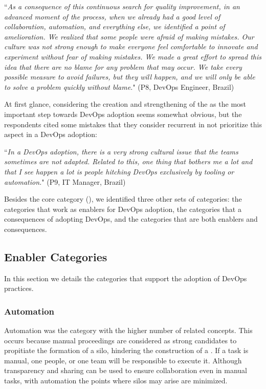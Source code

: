 \begin{mq}
``\emph{As a consequence of this continuous search for quality improvement, in an
advanced moment of the process, when we already had a good level of
collaboration, automation, and everything else, we identified a point of
amelioration. We realized that some people were afraid of making mistakes. Our
culture was not strong enough to make everyone feel comfortable to innovate and
experiment without fear of making mistakes. We made a great effort to spread
this idea that there are no blame for any problem that may occur. We take every possible
measure to avoid failures, but they
will happen, and we will only be able to solve a problem quickly without blame.}" (P8,
DevOps Engineer, Brazil)
\end{mq}

At first glance, considering the creation and strengthening of the  as the most important step towards DevOps adoption seems somewhat obvious, but
the respondents cited some mistakes that they consider recurrent in not
prioritize this aspect in a DevOps adoption:

\begin{mq}``\emph{In a DevOps adoption, there is a very strong cultural issue that the teams
sometimes are not adapted. Related to this, one thing that bothers me a lot and
that I see happen a lot is people hitching DevOps exclusively by tooling or
automation.}" (P9, IT Manager, Brazil)
\end{mq}

Besides the core category (), we identified
three other sets of categories: the categories that work as enablers
for DevOps adoption, the categories that a consequences of adopting
DevOps, and the categories that are both enablers and consequences.

\subsection{Enabler Categories}

In this section we details the categories that support the adoption of
DevOps practices. 
\subsubsection*{Automation} \label{ssec:automation}

Automation was the category with the higher number of related concepts. This
occurs because manual proceedings are considered as strong candidates to
propitiate the formation of a silo, hindering the construction
of a . If a task is manual, one people, or one
team will be responsible to execute it. Although transparency and sharing can
be used to ensure collaboration even in manual tasks, with automation the
points where silos may arise are minimized.

